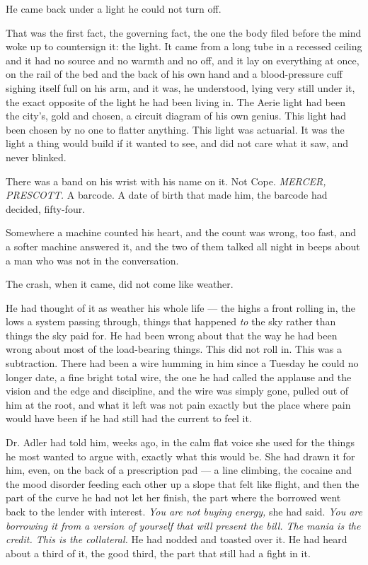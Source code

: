 \documentclass[11pt,openany]{book}
\newcommand{\scenebreak}{\par\vspace{0.5\baselineskip}\begin{center}\textasteriskcentered\quad\textasteriskcentered\quad\textasteriskcentered\end{center}\vspace{0.5\baselineskip}\par}
\begin{document}
He came back under a light he could not turn off.

That was the first fact, the governing fact, the one the body filed before the mind woke up to countersign it: the light. It came from a long tube in a recessed ceiling and it had no source and no warmth and no off, and it lay on everything at once, on the rail of the bed and the back of his own hand and a blood-pressure cuff sighing itself full on his arm, and it was, he understood, lying very still under it, the exact opposite of the light he had been living in. The Aerie light had been the city's, gold and chosen, a circuit diagram of his own genius. This light had been chosen by no one to flatter anything. This light was actuarial. It was the light a thing would build if it wanted to see, and did not care what it saw, and never blinked.

There was a band on his wrist with his name on it. Not Cope. \textit{MERCER, PRESCOTT.} A barcode. A date of birth that made him, the barcode had decided, fifty-four.

Somewhere a machine counted his heart, and the count was wrong, too fast, and a softer machine answered it, and the two of them talked all night in beeps about a man who was not in the conversation.


\scenebreak


The crash, when it came, did not come like weather.

He had thought of it as weather his whole life --- the highs a front rolling in, the lows a system passing through, things that happened \textit{to} the sky rather than things the sky paid for. He had been wrong about that the way he had been wrong about most of the load-bearing things. This did not roll in. This was a subtraction. There had been a wire humming in him since a Tuesday he could no longer date, a fine bright total wire, the one he had called the applause and the vision and the edge and discipline, and the wire was simply gone, pulled out of him at the root, and what it left was not pain exactly but the place where pain would have been if he had still had the current to feel it.

Dr. Adler had told him, weeks ago, in the calm flat voice she used for the things he most wanted to argue with, exactly what this would be. She had drawn it for him, even, on the back of a prescription pad --- a line climbing, the cocaine and the mood disorder feeding each other up a slope that felt like flight, and then the part of the curve he had not let her finish, the part where the borrowed went back to the lender with interest. \textit{You are not buying energy,} she had said. \textit{You are borrowing it from a version of yourself that will present the bill. The mania is the credit. This is the collateral.} He had nodded and toasted over it. He had heard about a third of it, the good third, the part that still had a fight in it.
\end{document}
